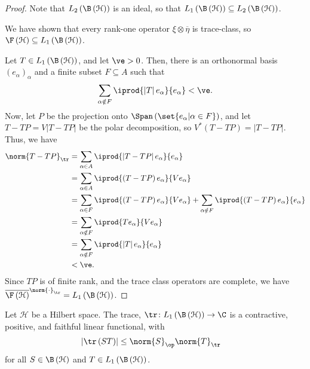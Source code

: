 \documentclass[10pt]{mypackage}
\begin{document}
\begin{proof}
  Note that $L_2\left( \B\left( \mathcal{H} \right) \right)$ is an ideal, so that $L_1\left( \B\left( \mathcal{H} \right) \right)\subseteq L_2\left( \B\left( \mathcal{H} \right) \right)$.\newline

  We have shown that every rank-one operator $\xi\otimes \overline{\eta}$ is trace-class, so $\F\left( \mathcal{H} \right)\subseteq L_1\left( \B\left( \mathcal{H} \right) \right)$.\newline

  Let $T \in L_1\left( \B\left( \mathcal{H} \right) \right)$, and let $\ve > 0$. Then, there is an orthonormal basis $\left( e_{\alpha} \right)_{\alpha}$ and a finite subset $F\subseteq A$ such that
  \begin{align*}
    \sum_{\alpha\notin F} \iprod{\left\vert T \right\vert e_{\alpha}}{e_{\alpha}} < \ve.
  \end{align*}
  Now, let $P$ be the projection onto $\Span\left( \set{e_{\alpha} | \alpha \in F} \right)$, and let $T - TP = V\left\vert T-TP \right\vert$ be the polar decomposition, so $V^{\ast}\left( T-TP \right) = \left\vert T-TP \right\vert$. Thus, we have
  \begin{align*}
    \norm{T-TP}_{\tr} &= \sum_{\alpha \in A} \iprod{\left\vert T-TP \right\vert e_{\alpha}}{e_{\alpha}}\\
                      &= \sum_{\alpha \in A} \iprod{\left( T-TP \right) e_{\alpha}}{Ve_{\alpha}}\\
                      &= \sum_{\alpha \in F} \iprod{\left( T-TP \right) e_{\alpha}}{Ve_{\alpha}} + \sum_{\alpha \notin F} \iprod{\left( T- TP \right)e_{\alpha}}{e_{\alpha}}\\
                      &= \sum_{\alpha\notin F} \iprod{Te_{\alpha}}{Ve_{\alpha}}\\
                      &= \sum_{\alpha\notin F} \iprod{\left\vert T \right\vert e_{\alpha}}{e_{\alpha}}\\
                      &< \ve.
  \end{align*}
  Since $TP$ is of finite rank, and the trace class operators are complete, we have $\overline{\F\left( \mathcal{H} \right)}^{\norm{\cdot}_{\tr}} = L_1\left( \B\left( \mathcal{H} \right) \right)$.
\end{proof}
\begin{proposition}
  Let $\mathcal{H}$ be a Hilbert space. The trace, $\tr\colon L_1\left( \B\left( \mathcal{H} \right) \right)\rightarrow \C$ is a contractive, positive, and faithful linear functional, with
  \begin{align*}
    \left\vert \tr\left( ST \right) \right\vert &\leq \norm{S}_{\op}\norm{T}_{\tr}
  \end{align*}
  for all $S\in \B\left( \mathcal{H} \right)$ and $T\in L_1\left( \B\left( \mathcal{H} \right) \right)$.
\end{proposition}
\end{document}

